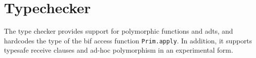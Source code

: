 \section{Typechecker}

The type checker provides support for polymorphic functions and \glspl{adt}, and hardcodes the type of the \gls{bif} access function \texttt{Prim.apply}. In addition, it supports typesafe receive clauses and ad-hoc polymorphism in an experimental form.
